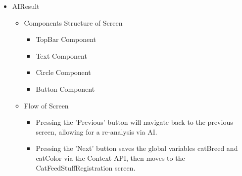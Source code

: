 \documentclass[conference]{IEEEtran}
\begin{document}
\begin{itemize}
\begin{itemize}
\begin{itemize}
        \end{itemize}
    \end{itemize}
    \item AIResult
    \begin{itemize}
        \item Components Structure of Screen
        \begin{itemize}
            \item TopBar Component
            \item Text Component
            \item Circle Component
            \item Button Component
        \end{itemize}
        \item Flow of Screen
        \begin{itemize}
            \item Pressing the 'Previous' button will navigate back to the previous screen, allowing for a re-analysis via AI.
            \item Pressing the 'Next' button saves the global variables catBreed and catColor via the Context API, then moves to the CatFeedStuffRegistration screen.\\
        \end{itemize}
    \end{itemize}
\end{itemize}
\end{document}

